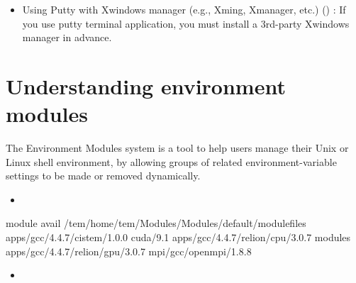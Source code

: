 \documentclass[letterpaper,10pt,english]{sphinxmanual}
\begin{document}
\begin{itemize}
\item {} 
Using Putty with Xwindows manager (e.g., Xming, Xmanager, etc.) () :
If you use putty terminal application, you must install a 3rd-party Xwindows manager in advance.

\end{itemize}




\section{Understanding environment modules}
\label{\detokenize{guide:understanding-environment-modules}}
The Environment Modules system is a tool to help users manage their Unix or Linux shell environment, by allowing groups of related environment-variable settings to be made or removed dynamically.
\begin{itemize}
\item {} 

\end{itemize}

\begin{sphinxVerbatim}[commandchars=\\\{\}]
\PYGZdl{}\PYGZgt{} module avail
\PYGZhy{}\PYGZhy{}\PYGZhy{}\PYGZhy{}\PYGZhy{}\PYGZhy{}\PYGZhy{}\PYGZhy{}\PYGZhy{}\PYGZhy{}\PYGZhy{} /tem/home/tem/Modules/Modules/default/modulefiles \PYGZhy{}\PYGZhy{}\PYGZhy{}\PYGZhy{}\PYGZhy{}\PYGZhy{}\PYGZhy{}\PYGZhy{}\PYGZhy{}\PYGZhy{}\PYGZhy{}\PYGZhy{}
apps/gcc/4.4.7/cistem/1.0.0     cuda/9.1
apps/gcc/4.4.7/relion/cpu/3.0.7 modules
apps/gcc/4.4.7/relion/gpu/3.0.7 mpi/gcc/openmpi/1.8.8
\end{sphinxVerbatim}
\begin{itemize}
\item {} 

\end{itemize}
\end{document}
